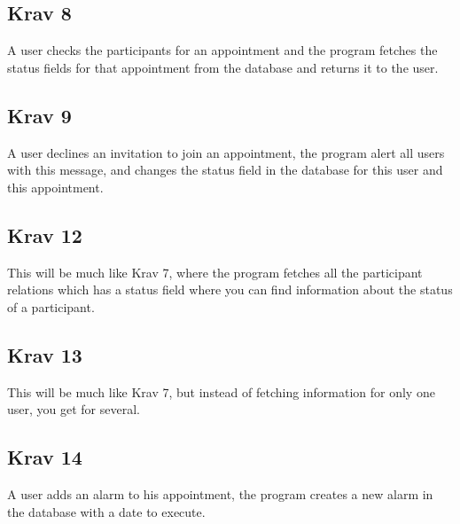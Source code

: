 \subsection{Krav 8}
A user checks the participants for an appointment and the program fetches the status fields for that appointment from the database and returns it to the user.

\subsection{Krav 9}
A user declines an invitation to join an appointment, the program alert all users with this message, and changes the status field in the database for this user and this appointment.

\subsection{Krav 12}
This will be much like Krav 7, where the program fetches all the participant relations which has a status field where you can find information about the status of a participant.

\subsection{Krav 13}
This will be much like Krav 7, but instead of fetching information for only one user, you get for several.

\subsection{Krav 14}
A user adds an alarm to his appointment, the program creates a new alarm in the database with a date to execute.

